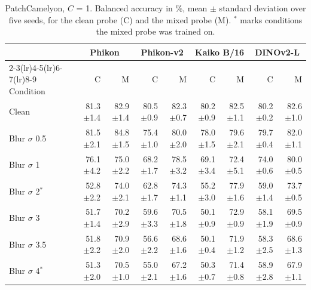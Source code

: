 \begin{table}[H]\centering\small
\caption{PatchCamelyon, $C$ = 1. Balanced accuracy in \%, mean $\pm$ standard deviation over five seeds, for the clean probe (C) and the mixed probe (M). $^{*}$ marks conditions the mixed probe was trained on.}
\label{tab:app3}
\setlength{\tabcolsep}{3.5pt}
\begin{tabular}{lrrrrrrrr}
\toprule
 & \multicolumn{2}{c}{Phikon} & \multicolumn{2}{c}{Phikon-v2} & \multicolumn{2}{c}{Kaiko B/16} & \multicolumn{2}{c}{DINOv2-L} \\
\cmidrule(lr){2-3}\cmidrule(lr){4-5}\cmidrule(lr){6-7}\cmidrule(lr){8-9}
Condition & C & M & C & M & C & M & C & M \\
\midrule
Clean & 81.3{\scriptsize$\pm$1.4} & 82.9{\scriptsize$\pm$1.4} & 80.5{\scriptsize$\pm$0.9} & 82.3{\scriptsize$\pm$0.7} & 80.2{\scriptsize$\pm$0.9} & 82.5{\scriptsize$\pm$1.1} & 80.2{\scriptsize$\pm$0.2} & 82.6{\scriptsize$\pm$1.0} \\
\addlinespace
Blur $\sigma$ 0.5 & 81.5{\scriptsize$\pm$2.1} & 84.8{\scriptsize$\pm$1.5} & 75.4{\scriptsize$\pm$1.0} & 80.0{\scriptsize$\pm$2.0} & 78.0{\scriptsize$\pm$1.5} & 79.6{\scriptsize$\pm$2.1} & 79.7{\scriptsize$\pm$0.4} & 82.0{\scriptsize$\pm$1.1} \\
Blur $\sigma$ 1 & 76.1{\scriptsize$\pm$4.2} & 75.0{\scriptsize$\pm$2.2} & 68.2{\scriptsize$\pm$1.7} & 78.5{\scriptsize$\pm$3.2} & 69.1{\scriptsize$\pm$3.4} & 72.4{\scriptsize$\pm$5.1} & 74.0{\scriptsize$\pm$0.6} & 80.0{\scriptsize$\pm$0.5} \\
Blur $\sigma$ 2$^{*}$ & 52.8{\scriptsize$\pm$2.2} & 74.0{\scriptsize$\pm$2.1} & 62.8{\scriptsize$\pm$1.7} & 74.3{\scriptsize$\pm$1.1} & 55.2{\scriptsize$\pm$3.0} & 77.9{\scriptsize$\pm$1.6} & 59.0{\scriptsize$\pm$1.4} & 73.7{\scriptsize$\pm$0.5} \\
Blur $\sigma$ 3 & 51.7{\scriptsize$\pm$1.4} & 70.2{\scriptsize$\pm$2.9} & 59.6{\scriptsize$\pm$3.3} & 70.5{\scriptsize$\pm$1.8} & 50.1{\scriptsize$\pm$0.9} & 72.9{\scriptsize$\pm$0.9} & 58.1{\scriptsize$\pm$1.9} & 69.5{\scriptsize$\pm$0.9} \\
Blur $\sigma$ 3.5 & 51.8{\scriptsize$\pm$2.2} & 70.9{\scriptsize$\pm$2.0} & 56.6{\scriptsize$\pm$2.2} & 68.6{\scriptsize$\pm$1.6} & 50.1{\scriptsize$\pm$0.4} & 71.9{\scriptsize$\pm$1.2} & 58.3{\scriptsize$\pm$2.5} & 68.6{\scriptsize$\pm$1.3} \\
Blur $\sigma$ 4$^{*}$ & 51.3{\scriptsize$\pm$2.0} & 70.5{\scriptsize$\pm$1.0} & 55.0{\scriptsize$\pm$2.1} & 67.2{\scriptsize$\pm$1.6} & 50.3{\scriptsize$\pm$0.7} & 71.4{\scriptsize$\pm$0.8} & 58.9{\scriptsize$\pm$2.8} & 67.9{\scriptsize$\pm$1.1} \\

\end{tabular}
\end{table}
